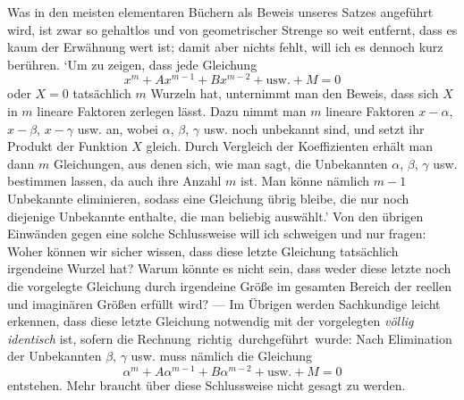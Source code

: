 Was in den meisten elementaren Büchern als Beweis unseres Satzes angeführt wird, ist zwar so gehaltlos und von geometrischer Strenge so weit entfernt, dass es kaum der Erwähnung wert ist; damit aber nichts fehlt, will ich es dennoch kurz berühren. `Um zu zeigen, dass jede Gleichung
\[
x^m+Ax^{m-1}+Bx^{m-2}+\text{usw.}+M=0
\]
oder $X=0$ tatsächlich $m$ Wurzeln hat, unternimmt man den Beweis, dass sich $X$ in $m$ lineare Faktoren zerlegen lässt. Dazu nimmt man $m$ lineare Faktoren $x-\alpha$, $x-\beta$, $x-\gamma$ usw. an, wobei $\alpha$, $\beta$, $\gamma$ usw. noch unbekannt sind, und setzt ihr Produkt der Funktion $X$ gleich. Durch Vergleich der Koeffizienten erhält man dann $m$ Gleichungen, aus denen sich, wie man sagt, die Unbekannten $\alpha$, $\beta$, $\gamma$ usw. bestimmen lassen, da auch ihre Anzahl $m$ ist. Man könne nämlich $m-1$ Unbekannte eliminieren, sodass eine Gleichung übrig bleibe, die nur noch diejenige Unbekannte enthalte, die man beliebig auswählt.' Von den übrigen Einwänden gegen eine solche Schlussweise will ich schweigen und nur fragen: Woher können wir sicher wissen, dass diese letzte Gleichung tatsächlich irgendeine Wurzel hat? Warum könnte es nicht sein, dass weder diese letzte noch die vorgelegte Gleichung durch irgendeine Größe im gesamten Bereich der reellen und imaginären Größen erfüllt wird? --- Im Übrigen werden Sachkundige leicht erkennen, dass diese letzte Gleichung notwendig mit der vorgelegten \textit{völlig identisch} ist, sofern die \mbox{Rechnung richtig durchgeführt wurde}: Nach Elimination der Unbekannten $\beta$, $\gamma$ usw. muss nämlich die Gleichung
\[
\alpha^m+A\alpha^{m-1}+B\alpha^{m-2}+\text{usw.}+M=0
\]
entstehen. Mehr braucht über diese Schlussweise nicht gesagt zu werden.

